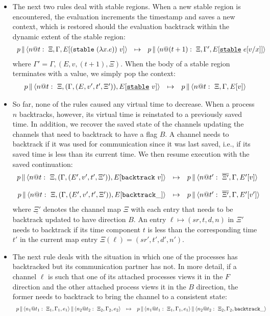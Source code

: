 \documentclass{article}
\begin{document}
\begin{itemize}
\item The next two rules deal with stable regions. When a new stable region
  is encountered, the evaluation increments the timestamp and saves a new
  context, which is restored should the evaluation backtrack within the
  dynamic extent of the stable region:
\[\begin{array}{rcl}
  \parc{p}{\proc{n}{\Gamma}{\Xi}{E[(\stable{(\lambda x.e)})~v]}{t}} &\mapsto&
  \parc{p}{\proc{n}{\Gamma'}{\Xi}{E[\stableu{e[v/x]}]}{(t+1)}} 
\end{array}\]
where $\Gamma' = \Gamma,(E,v,(t+1),\Xi)$. When the body of a stable 
region terminates with a value, we simply pop the context:
\[\begin{array}{rcl}
  \parc{p}{\proc{n}{(\Gamma,(E,v',t',\Xi'))}{\Xi}{E[\stableu{v}]}{t}} 
  &\mapsto& 
  \parc{p}{\proc{n}{\Gamma}{\Xi}{E[v]}{t}} 
\end{array}\]

\item So far, none of the rules caused any virtual time to decrease. When a
  process $n$ backtracks, however, its virtual time is reinstated to a
  previously saved time. In addition, we recover the saved state of the
  channels updating the channels that need to backtrack to have a flag $B$. A
  channel needs to backtrack if it was used for communication since it was
  last saved, i.e., if its saved time is less than its current time. We then
  resume execution with the saved continuation:
\[\begin{array}{rcl}
  \parc{p}{\proc{n}{(\Gamma,(E',v',t',\Xi'))}{\Xi}{E[\backtrack{v}]}{t}} 
  &\mapsto& 
  \parc{p}{\proc{n}{\Gamma}{\overline{\Xi'}}{E'[v]}{t'}} \\
\\
  \parc{p}{\proc{n}{(\Gamma,(E',v',t',\Xi'))}{\Xi}{E[\abacktrack]}{t}} 
  &\mapsto& 
  \parc{p}{\proc{n}{\Gamma}{\overline{\Xi'}}{E'[v']}{t'}} 
\end{array}\]
where $\underline{\Xi'}$ denotes the channel map $\Xi$ with each entry that
needs to be backtrack updated to have direction $B$. An entry $\ell \mapsto
(sr,t,d,n)$ in $\Xi'$ needs to backtrack if its time component $t$ is less
than the corresponding time $t'$ in the current map entry $\Xi(\ell) =
(sr',t',d',n')$.

\item The next rule deals with the situation in which one of the
  processes has backtracked but its communication partner has not. In more
  detail, if a channel $\ell$ is such that one of its attached processes
  views it in the $F$ direction and the other attached process views it in
  the $B$ direction, the former needs to backtrack to bring the channel to a
  consistent state:
\[\begin{array}{rcl}
\parc{p}
  {\parc{\proc{n_1}{\Gamma_1}{\Xi_1}{e_1}{t_1}}
  {\proc{n_2}{\Gamma_2}{\Xi_2}{e_2}{t_2}}} &\mapsto& 
\parc{p}
  {\parc{\proc{n_1}{\Gamma_1}{\Xi_1}{e_1}{t_1}}
  {\proc{n_2}{\Gamma_2}{\Xi_2}{\abacktrack}{t_2}}} 
\end{array}\]


\end{itemize}
\end{document}
